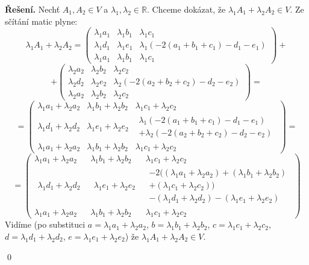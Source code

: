 \documentclass{article}
\theoremstyle{definition}
\theoremstyle{plain}
\newcommand{\R}{\mathbb{R}}
\newenvironment{reseni}{\noindent\textbf{Řešení.}\hspace{0.5em}}{\hfill\qed\medskip}
\begin{document}
\begin{reseni}
Nechť $A_1, A_2 \in V$ a $\lambda_1, \lambda_2 \in \R$. Chceme dokázat, že $\lambda_1 A_1 + \lambda_2 A_2 \in V$.
Ze sčítání matic plyne: 
\[
\lambda_1 A_1 + \lambda_2 A_2 = \begin{pmatrix}
\lambda_1 a_1 & \lambda_1 b_1 & \lambda_1 c_1 \\
\lambda_1 d_1 & \lambda_1 e_1 & \lambda_1 (-2(a_1 + b_1 + c_1) - d_1 - e_1) \\
\lambda_1 a_1 & \lambda_1 b_1 & \lambda_1 c_1
\end{pmatrix} + \] \[ + \begin{pmatrix}
\lambda_2 a_2 & \lambda_2 b_2 & \lambda_2 c_2 \\
\lambda_2 d_2 & \lambda_2 e_2 & \lambda_2 (-2(a_2 + b_2 + c_2) - d_2 - e_2) \\
\lambda_2 a_2 & \lambda_2 b_2 & \lambda_2 c_2
\end{pmatrix}
= \] \[ = \begin{pmatrix}
\lambda_1 a_1 + \lambda_2 a_2 & \lambda_1 b_1 + \lambda_2 b_2 & \lambda_1 c_1 + \lambda_2 c_2 \\
\lambda_1 d_1 + \lambda_2 d_2 & \lambda_1 e_1 + \lambda_2 e_2 & \begin{array}{c} \lambda_1 (-2(a_1 + b_1 + c_1) - d_1 - e_1) \\ + \lambda_2 (-2(a_2 + b_2 + c_2) - d_2 - e_2) \end{array} \\
\lambda_1 a_1 + \lambda_2 a_2 & \lambda_1 b_1 + \lambda_2 b_2 & \lambda_1 c_1 + \lambda_2 c_2
\end{pmatrix}
= \] \[ = \begin{pmatrix}
\lambda_1 a_1 + \lambda_2 a_2 & \lambda_1 b_1 + \lambda_2 b_2 & \lambda_1 c_1 + \lambda_2 c_2 \\
\begin{array}{c} \lambda_1 d_1 + \lambda_2 d_2 \end{array} & \begin{array}{c} \lambda_1 e_1 + \lambda_2 e_2 \end{array} & \begin{array}{c} -2((\lambda_1 a_1 + \lambda_2 a_2) + (\lambda_1 b_1 + \lambda_2 b_2) \\ + (\lambda_1 c_1 + \lambda_2 c_2)) \\ - (\lambda_1 d_1 + \lambda_2 d_2) - (\lambda_1 e_1 + \lambda_2 e_2) \end{array} \\
\lambda_1 a_1 + \lambda_2 a_2 & \lambda_1 b_1 + \lambda_2 b_2 & \lambda_1 c_1 + \lambda_2 c_2
\end{pmatrix}
\]
Vidíme (po substituci $a = \lambda_1 a_1 + \lambda_2 a_2$, $b = \lambda_1 b_1 + \lambda_2 b_2$, $c = \lambda_1 c_1 + \lambda_2 c_2$, $d = \lambda_1 d_1 + \lambda_2 d_2$, $e = \lambda_1 e_1 + \lambda_2 e_2$) že $\lambda_1 A_1 + \lambda_2 A_2 \in V$.


\end{reseni}
\end{document}
